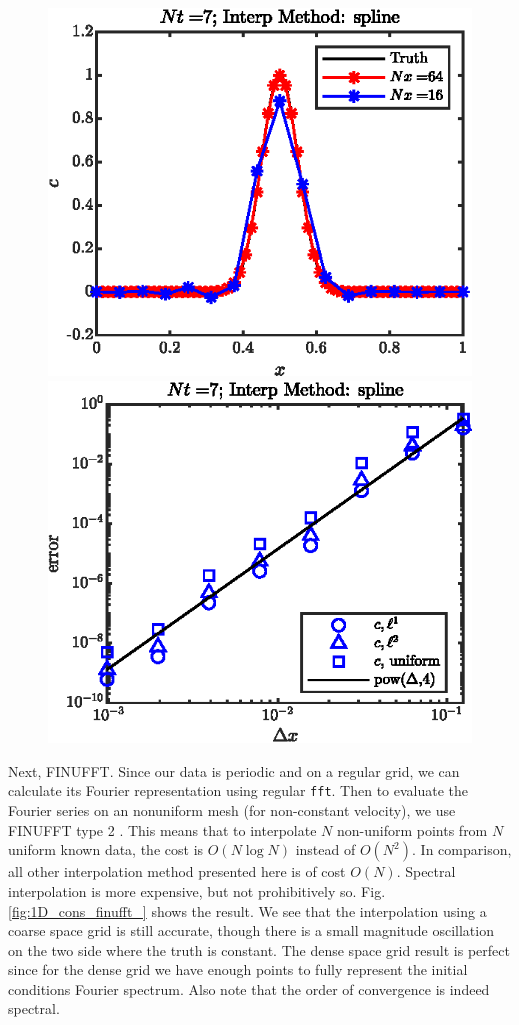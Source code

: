 \documentclass[11pt,letterpaper]{article}
\begin{document}
\begin{figure}[H]
    \centering
    \includegraphics{figs/1D_cons_spline_sol}
    \includegraphics{figs/1D_cons_spline_convord}
    \caption{}\label{fig:1D_cons_spline_}
\end{figure}
Next, FINUFFT. Since our data is periodic and on a regular grid, we can calculate its Fourier representation using regular \texttt{fft}. Then to evaluate the Fourier series on an nonuniform mesh (for non-constant velocity), we use FINUFFT type 2 \cite{finufft_1}. This means that to interpolate $N$ non-uniform points from $N$ uniform known data, the cost is $O(N\log N)$ instead of $O(N^2)$. In comparison, all other interpolation method presented here is of cost $O(N)$. Spectral interpolation is more expensive, but not prohibitively so. Fig. \ref{fig:1D_cons_finufft_} shows the result. We see that the interpolation using a coarse space grid is still accurate, though there is a small magnitude oscillation on the two side where the truth is constant. The dense space grid result is perfect since for the dense grid we have enough points to fully represent the initial conditions Fourier spectrum. Also note that the order of convergence is indeed spectral.
\end{document}
